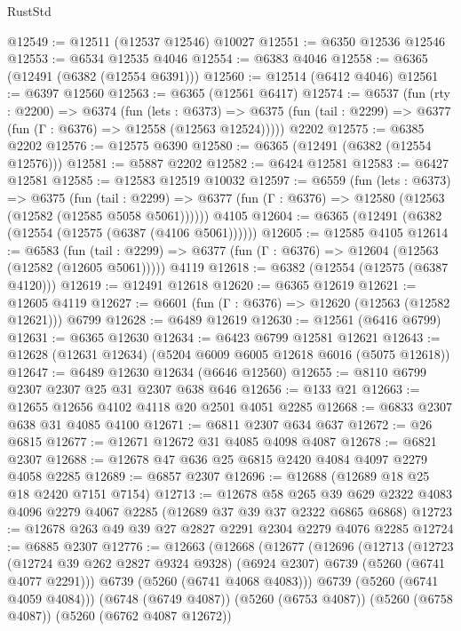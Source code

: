 \begin{lexlean}{RustStd}
\begin{coremodule}
@12549 := @12511 (@12537 @12546) @10027
@12551 := @6350 @12536 @12546
@12553 := @6534 @12535 @4046
@12554 := @6383 @4046
@12558 := @6365 (@12491 (@6382 (@12554 @6391)))
@12560 := @12514 (@6412 @4046)
@12561 := @6397 @12560
@12563 := @6365 (@12561 @6417)
@12574 := @6537
    (fun (rty : @2200) =>
    @6374
      (fun (lets : @6373) =>
      @6375 (fun (tail : @2299) => @6377 (fun (Γ : @6376) => @12558 (@12563 @12524)))))
    @2202
@12575 := @6385 @2202
@12576 := @12575 @6390
@12580 := @6365 (@12491 (@6382 (@12554 @12576)))
@12581 := @5887 @2202
@12582 := @6424 @12581
@12583 := @6427 @12581
@12585 := @12583 @12519 @10032
@12597 := @6559
    (fun (lets : @6373) =>
    @6375
      (fun (tail : @2299) =>
      @6377 (fun (Γ : @6376) => @12580 (@12563 (@12582 (@12585 @5058 @5061))))))
    @4105
@12604 := @6365 (@12491 (@6382 (@12554 (@12575 (@6387 (@4106 @5061))))))
@12605 := @12585 @4105
@12614 := @6583
    (fun (tail : @2299) => @6377 (fun (Γ : @6376) => @12604 (@12563 (@12582 (@12605 @5061)))))
    @4119
@12618 := @6382 (@12554 (@12575 (@6387 @4120)))
@12619 := @12491 @12618
@12620 := @6365 @12619
@12621 := @12605 @4119
@12627 := @6601 (fun (Γ : @6376) => @12620 (@12563 (@12582 @12621))) @6799
@12628 := @6489 @12619
@12630 := @12561 (@6416 @6799)
@12631 := @6365 @12630
@12634 := @6423 @6799 @12581 @12621
@12643 := @12628 (@12631 @12634) (@5204 @6009 @6005 @12618 @6016 (@5075 @12618))
@12647 := @6489 @12630 @12634 (@6646 @12560)
@12655 := @8110 @6799 @2307 @2307 @25 @31 @2307 @638 @646
@12656 := @133 @21
@12663 := @12655 @12656 @4102 @4118 @20 @2501 @4051 @2285
@12668 := @6833 @2307 @638 @31 @4085 @4100
@12671 := @6811 @2307 @634 @637
@12672 := @26 @6815
@12677 := @12671 @12672 @31 @4085 @4098 @4087
@12678 := @6821 @2307
@12688 := @12678 @47 @636 @25 @6815 @2420 @4084 @4097 @2279 @4058 @2285
@12689 := @6857 @2307
@12696 := @12688 (@12689 @18 @25 @18 @2420 @7151 @7154)
@12713 := @12678
    @58
    @265
    @39
    @629
    @2322
    @4083
    @4096
    @2279
    @4067
    @2285
    (@12689 @37 @39 @37 @2322 @6865 @6868)
@12723 := @12678 @263 @49 @39 @27 @2827 @2291 @2304 @2279 @4076 @2285
@12724 := @6885 @2307
@12776 := @12663
    (@12668
      (@12677
        (@12696
          (@12713
            (@12723
              (@12724 @39 @262 @2827 @9324 @9328)
              (@6924 @2307)
              @6739
              (@5260 (@6741 @4077 @2291)))
            @6739
            (@5260 (@6741 @4068 @4083)))
          @6739
          (@5260 (@6741 @4059 @4084)))
        (@6748 (@6749 @4087))
        (@5260 (@6753 @4087))
        (@5260 (@6758 @4087))
        (@5260 (@6762 @4087 @12672))

\end{coremodule}
\end{lexlean}

